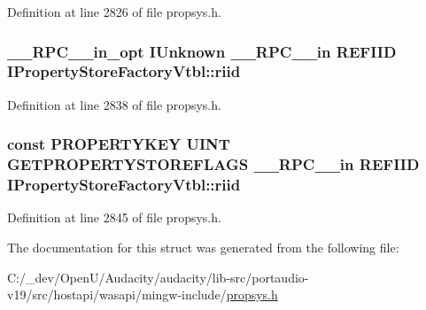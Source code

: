 Definition at line 2826 of file propsys.\+h.

\subsubsection[{\texorpdfstring{riid}{riid}}]{ {\bf \+\_\+\+\_\+\+R\+P\+C\+\_\+\+\_\+in\+\_\+opt} I\+Unknown {\bf \+\_\+\+\_\+\+R\+P\+C\+\_\+\+\_\+in} {\bf R\+E\+F\+I\+ID} I\+Property\+Store\+Factory\+Vtbl\+::riid}\hypertarget{struct_i_property_store_factory_vtbl_a3f09fdb9a6ae5f71e5cfe2f1948ba2c5}{}\label{struct_i_property_store_factory_vtbl_a3f09fdb9a6ae5f71e5cfe2f1948ba2c5}


Definition at line 2838 of file propsys.\+h.

\subsubsection[{\texorpdfstring{riid}{riid}}]{ {\bf const} {\bf P\+R\+O\+P\+E\+R\+T\+Y\+K\+EY} {\bf U\+I\+NT} {\bf G\+E\+T\+P\+R\+O\+P\+E\+R\+T\+Y\+S\+T\+O\+R\+E\+F\+L\+A\+GS} {\bf \+\_\+\+\_\+\+R\+P\+C\+\_\+\+\_\+in} {\bf R\+E\+F\+I\+ID} I\+Property\+Store\+Factory\+Vtbl\+::riid}\hypertarget{struct_i_property_store_factory_vtbl_a70217a561039dd76e2cd8ff20c4ef891}{}\label{struct_i_property_store_factory_vtbl_a70217a561039dd76e2cd8ff20c4ef891}


Definition at line 2845 of file propsys.\+h.



The documentation for this struct was generated from the following file\+:\begin{DoxyCompactItemize}
\item 
C\+:/\+\_\+dev/\+Open\+U/\+Audacity/audacity/lib-\/src/portaudio-\/v19/src/hostapi/wasapi/mingw-\/include/\hyperlink{propsys_8h}{propsys.\+h}\end{DoxyCompactItemize}
